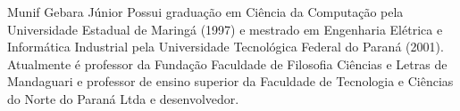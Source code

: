 \documentclass[journal]{IEEEtran}
\begin{document}
\begin{IEEEbiography}{Munif Gebara Júnior}
Possui graduação em Ciência da Computação pela Universidade Estadual de Maringá (1997) e mestrado em Engenharia Elétrica e Informática Industrial pela Universidade Tecnológica Federal do Paraná (2001). Atualmente é professor da Fundação Faculdade de Filosofia Ciências e Letras de Mandaguari e professor de ensino superior da Faculdade de Tecnologia e Ciências do Norte do Paraná Ltda e desenvolvedor.
\end{IEEEbiography}
\end{document}
